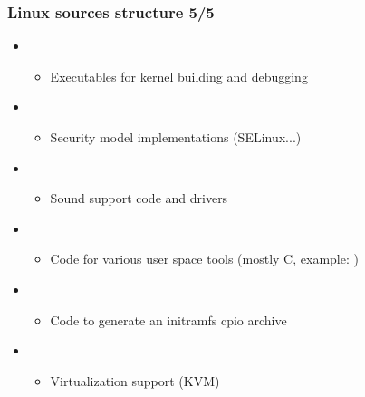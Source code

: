 \begin{frame}
  \frametitle{Linux sources structure 5/5}
  \begin{itemize}
  \item {}
    \begin{itemize}
    \item Executables for kernel building and debugging
    \end{itemize}
  \item {}
    \begin{itemize}
    \item Security model implementations (SELinux...)
    \end{itemize}
  \item {}
    \begin{itemize}
    \item Sound support code and drivers
    \end{itemize}
  \item {}
    \begin{itemize}
    \item Code for various user space tools (mostly C, example:
          )
    \end{itemize}
  \item {}
    \begin{itemize}
    \item Code to generate an initramfs cpio archive
    \end{itemize}
  \item {}
    \begin{itemize}
    \item Virtualization support (KVM)
    \end{itemize}
  \end{itemize}
\end{frame}
